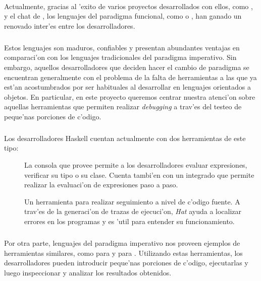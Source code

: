 \documentclass[a4paper]{article}
\begin{document}
\paragraph{}Actualmente, gracias al 'exito de varios proyectos desarrollados con ellos, como ,  y el chat de , los lenguajes del paradigma funcional, como  o , han ganado un renovado inter'es entre los desarrolladores.
\subparagraph{}Estos lenguajes son maduros, confiables y presentan abundantes ventajas en comparaci'on con los lenguajes tradicionales del paradigma imperativo.  Sin embargo, aquellos desarrolladores que deciden hacer el cambio de paradigma se encuentran generalmente con el problema de la falta de herramientas a las que ya est'an acostumbrados por ser habituales al desarrollar en lenguajes orientados a objetos.  En particular, en este proyecto queremos centrar nuestra atenci'on sobre aquellas herramientas que permiten realizar \textsl{debugging} a trav'es del testeo de peque'nas porciones de c'odigo.
\subparagraph{}Los desarrolladores Haskell cuentan actualmente con dos herramientas de este tipo:
\begin{description}
	\item[]
		La consola que provee  permite a los desarrolladores evaluar expresiones, verificar su tipo o su clase.  Cuenta tambi'en con un  integrado que permite realizar la evaluaci'on de expresiones paso a paso.
	\item[]
		Un herramienta para realizar seguimiento a nivel de c'odigo fuente.  A trav'es de la generaci'on de trazas de ejecuci'on, \textit{Hat} ayuda a localizar errores en los programas y es 'util para entender su funcionamiento.
\end{description}
\subparagraph{}Por otra parte, lenguajes del paradigma imperativo nos proveen ejemplos de herramientas similares, como  para  y  para .  Utilizando estas herramientas, los desarrolladores pueden introducir peque'nas porciones de c'odigo, ejecutarlas y luego inspeccionar y analizar los resultados obtenidos.
\end{document}
